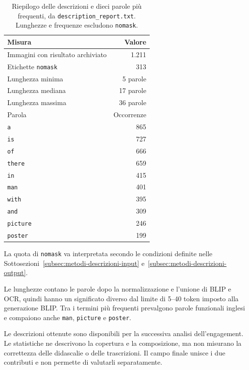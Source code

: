 \begin{table}[htbp]
    \centering
    \small
    \caption{Riepilogo delle descrizioni e dieci parole più frequenti, da \texttt{description\_report.txt}. Lunghezze e frequenze escludono \texttt{nomask}.}
    \label{tab:risultati-descrizioni}
    \begin{tabular}{@{}lr@{}}
        \toprule
        Misura & Valore \\
        \midrule
        Immagini con risultato archiviato & 1.211 \\
        Etichette \texttt{nomask} & 313 \\
        Lunghezza minima & 5 parole \\
        Lunghezza mediana & 17 parole \\
        Lunghezza massima & 36 parole \\
        \midrule
        Parola & Occorrenze \\
        \midrule
        \texttt{a} & 865 \\
        \texttt{is} & 727 \\
        \texttt{of} & 666 \\
        \texttt{there} & 659 \\
        \texttt{in} & 415 \\
        \texttt{man} & 401 \\
        \texttt{with} & 395 \\
        \texttt{and} & 309 \\
        \texttt{picture} & 246 \\
        \texttt{poster} & 199 \\
        \bottomrule
    \end{tabular}
\end{table}

La quota di \texttt{nomask} va interpretata secondo le condizioni definite nelle Sottosezioni~\ref{subsec:metodi-descrizioni-input} e~\ref{subsec:metodi-descrizioni-output}.

Le lunghezze contano le parole dopo la normalizzazione e l'unione di BLIP e OCR, quindi hanno un significato diverso dal limite di 5--40 token imposto alla generazione BLIP. Tra i termini più frequenti prevalgono parole funzionali inglesi e compaiono anche \texttt{man}, \texttt{picture} e \texttt{poster}.

Le descrizioni ottenute sono disponibili per la successiva analisi dell'engagement. Le statistiche ne descrivono la copertura e la composizione, ma non misurano la correttezza delle didascalie o delle trascrizioni. Il campo finale unisce i due contributi e non permette di valutarli separatamente.

